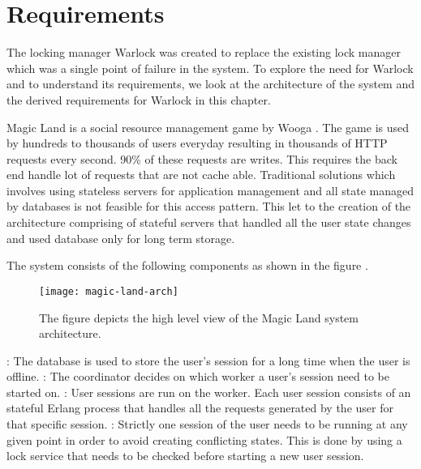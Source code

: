 \chapter{Requirements}
\label{chapter:requirements}

The locking manager Warlock was created to replace the existing lock manager
which was a single point of failure in the system. To explore the need for
Warlock and to understand its requirements, we look at the architecture of
the system and the derived requirements for Warlock in this chapter.

Magic Land \citep{magicland} is a social%
resource management game by Wooga%
. The game is used by hundreds to thousands of users everyday resulting in
thousands of HTTP requests every second. 90\% of these requests are writes.
This requires the back end%
handle lot of requests that are not cache able. Traditional solutions which
involves using stateless servers for application management and all state
managed
by databases is not feasible for this access pattern. This let to the creation
of the architecture comprising of stateful servers that handled all the user
state changes and used database only for long term storage.

The system consists of the following components as shown in the figure
.

\begin{figure}
  \texttt{[image: magic-land-arch]}
  \caption[Magic Land Architecture]{%
    The figure depicts the high level view of the Magic Land system
    architecture.}
    \label{figure:magic.land.architecture}
  \normalcaption
\end{figure}

\begin{itemize}
    : The database is used to store the user's session for
    a long time when the user is offline.
    : The coordinator decides on which worker a user's
    session need to be started on.
    : User sessions are run on the worker. Each user session
    consists of an stateful Erlang process that handles all the requests
    generated by the user for that specific session.
    : Strictly one session of the user needs to be
    running at any given point in order to avoid creating conflicting states.
    This is done by using a lock service that needs to be checked before
    starting a new user session.
\end{itemize}

